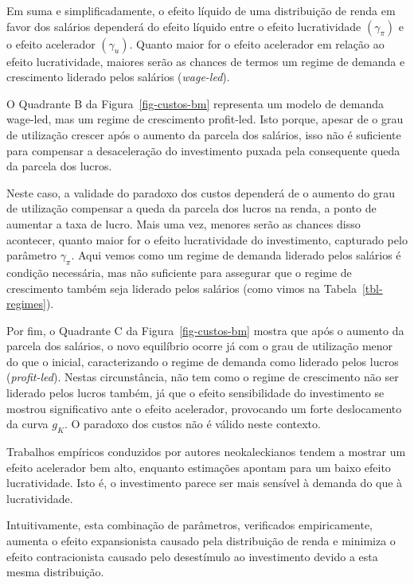 \documentclass[
  brazilian,
  letterpaper,
  DIV=11,
  numbers=noendperiod]{scrreprt}
\begin{document}
Em suma e simplificadamente, o efeito líquido de uma distribuição de
renda em favor dos salários dependerá do efeito líquido entre o efeito
lucratividade \((\gamma_\pi)\) e o efeito acelerador \((\gamma_u)\).
Quanto maior for o efeito acelerador em relação ao efeito lucratividade,
maiores serão as chances de termos um regime de demanda e crescimento
liderado pelos salários (\emph{wage-led}).

O Quadrante B da Figura~\ref{fig-custos-bm} representa um modelo de
demanda wage-led, mas um regime de crescimento profit-led. Isto porque,
apesar de o grau de utilização crescer após o aumento da parcela dos
salários, isso não é suficiente para compensar a desaceleração do
investimento puxada pela consequente queda da parcela dos lucros.

Neste caso, a validade do paradoxo dos custos dependerá de o aumento do
grau de utilização compensar a queda da parcela dos lucros na renda, a
ponto de aumentar a taxa de lucro. Mais uma vez, menores serão as
chances disso acontecer, quanto maior for o efeito lucratividade do
investimento, capturado pelo parâmetro \(\gamma_\pi\). Aqui vemos como
um regime de demanda liderado pelos salários é condição necessária, mas
não suficiente para assegurar que o regime de crescimento também seja
liderado pelos salários (como vimos na Tabela~\ref{tbl-regimes}).

Por fim, o Quadrante C da Figura~\ref{fig-custos-bm} mostra que após o
aumento da parcela dos salários, o novo equilíbrio ocorre já com o grau
de utilização menor do que o inicial, caracterizando o regime de demanda
como liderado pelos lucros (\emph{profit-led}). Nestas circunstância,
não tem como o regime de crescimento não ser liderado pelos lucros
também, já que o efeito sensibilidade do investimento se mostrou
significativo ante o efeito acelerador, provocando um forte deslocamento
da curva \(g_K\). O paradoxo dos custos não é válido neste contexto.

Trabalhos empíricos conduzidos por autores neokaleckianos tendem a
mostrar um efeito acelerador bem alto, enquanto estimações apontam para
um baixo efeito lucratividade. Isto é, o investimento parece ser mais
sensível à demanda do que à lucratividade.

Intuitivamente, esta combinação de parâmetros, verificados
empiricamente, aumenta o efeito expansionista causado pela distribuição
de renda e minimiza o efeito contracionista causado pelo desestímulo ao
investimento devido a esta mesma distribuição.
\end{document}
